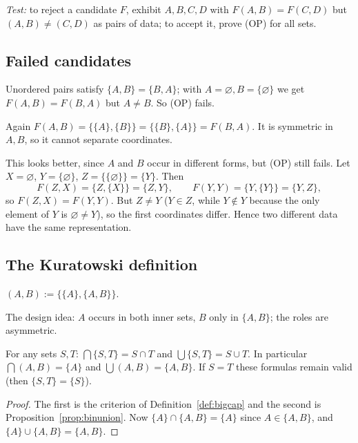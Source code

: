 \emph{Test:} to reject a candidate $F$, exhibit $A,B,C,D$ with $F(A,B)=F(C,D)$ but $(A,B)\neq(C,D)$ as pairs of data; to accept it, prove (OP) for all sets.

\subsection{Failed candidates}

\begin{example}[$F(A,B)=\{A,B\}$]
	Unordered pairs satisfy $\{A,B\}=\{B,A\}$; with $A=\varnothing,B=\{\varnothing\}$ we get $F(A,B)=F(B,A)$ but $A\ne B$. So (OP) fails.
\end{example}

\begin{example}[$F(A,B)=\{\{A\},\{B\}\}$]
	Again $F(A,B)=\{\{A\},\{B\}\}=\{\{B\},\{A\}\}=F(B,A)$. It is symmetric in $A,B$, so it cannot separate coordinates.
\end{example}

\begin{example}[$F(A,B)=\{A,\{B\}\}$]\label{ex:Ab}
	This looks better, since $A$ and $B$ occur in different forms, but (OP) still fails. Let $X=\varnothing$, $Y=\{\varnothing\}$, $Z=\{\{\varnothing\}\}=\{Y\}$. Then
	\[
	F(Z,X)=\{Z,\{X\}\}=\{Z,Y\},\qquad F(Y,Y)=\{Y,\{Y\}\}=\{Y,Z\},
	\]
	so $F(Z,X)=F(Y,Y)$. But $Z\ne Y$ ($Y\in Z$, while $Y\notin Y$ because the only element of $Y$ is $\varnothing\ne Y$), so the first coordinates differ. Hence two different data have the same representation.
\end{example}

\subsection{The Kuratowski definition}

\begin{definition}
	$(A,B):=\{\{A\},\{A,B\}\}$.
\end{definition}

The design idea: $A$ occurs in both inner sets, $B$ only in $\{A,B\}$; the roles are asymmetric.

\begin{lemma}\label{lem:kur-int-union}
	For any sets $S,T$: $\bigcap\{S,T\}=S\cap T$ and $\bigcup\{S,T\}=S\cup T$. In particular $\bigcap(A,B)=\{A\}$ and $\bigcup(A,B)=\{A,B\}$. If $S=T$ these formulas remain valid (then $\{S,T\}=\{S\}$).
\end{lemma}
\begin{proof}
	The first is the criterion of Definition~\ref{def:bigcap} and the second is Proposition~\ref{prop:binunion}. Now $\{A\}\cap\{A,B\}=\{A\}$ since $A\in\{A,B\}$, and $\{A\}\cup\{A,B\}=\{A,B\}$.
\end{proof}


